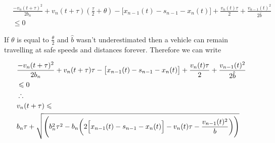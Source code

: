 \begin{equation*}
\begin{split}
&\frac{-v_n(t + \tau)^2}{2b_n} + v_n(t + \tau)(\frac{\tau}{2} + \theta) - \bigl[x_{n-1}(t) - s_{n-1} - x_n(t)\bigr] + \frac{v_n(t)\tau}{2} + \frac{v_{n-1}(t)^2}{2\hat{b}} \\
&\leqslant 0 
\end{split}
\end{equation*}

If $\theta$ is equal to $\frac{\theta}{2}$ and $\hat{b}$ wasn't underestimated then a vehicle can remain travelling at safe speeds and distances forever. Therefore we can write

\begin{equation*}
\begin{split}
&\frac{-v_n(t + \tau)^2}{2b_n} + v_n(t + \tau)\tau - \bigl[x_{n-1}(t) - s_{n-1} - x_n(t)\bigr] + \frac{v_n(t)\tau}{2} + \frac{v_{n-1}(t)^2}{2\hat{b}} \\
&\leqslant 0 \\
&\therefore \\
&v_n(t + \tau) \leqslant \\
&b_n\tau + \sqrt{\Biggl(b_n^2\tau^2 - b_n\biggl(2\Bigl[x_{n-1}(t) - s_{n-1} - x_n(t)\Bigr] - v_n(t)\tau - \frac{v_{n-1}(t)^2}{b}\biggr)\Biggr)}
\end{split}
\end{equation*}